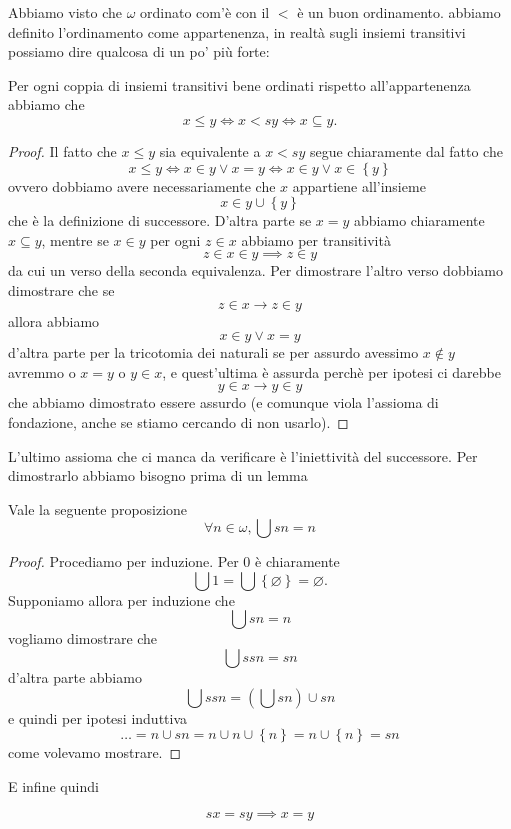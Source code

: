 \documentclass[11pt]{scrartcl}
\newcommand{\eset}{\varnothing}
\begin{document}
 	Abbiamo visto che $\omega$ ordinato com'è con il $<$ è un buon ordinamento. abbiamo definito l'ordinamento come appartenenza, in realtà sugli insiemi transitivi possiamo dire qualcosa di un po' più forte:
 	\begin{proposition}
 		Per ogni coppia di insiemi transitivi bene ordinati rispetto all'appartenenza abbiamo che
 		$$x\le y \iff x< sy \iff x\subseteq y.$$
 	\end{proposition}
 	\begin{proof}
 		Il fatto che $x\le y$ sia equivalente a $x<sy$ segue chiaramente dal fatto che
 		$$x\le y \iff x\in y\lor x=y \iff x\in y\lor x\in\left\{y\right\} $$
 		ovvero dobbiamo avere necessariamente che $x$ appartiene all'insieme 
 		$$x\in y\cup\left\{y\right\}$$
 		che è la definizione di successore. D'altra parte se $x=y$ abbiamo chiaramente $x\subseteq y$, mentre se $x\in y$ per ogni $z\in x$ abbiamo per transitività
 		$$z\in x \in y \implies z\in y$$
 		da cui un verso della seconda equivalenza. Per dimostrare l'altro verso dobbiamo dimostrare che se 
 		$$z\in x \to z\in y$$
 		allora abbiamo 
 		$$x\in y \lor x=y$$
 		d'altra parte per la tricotomia dei naturali se per assurdo avessimo $x\not\in y$ avremmo o $x=y$ o $y\in x$, e quest'ultima è assurda perchè per ipotesi ci darebbe
 		$$y\in x \to y\in y$$
 		che abbiamo dimostrato essere assurdo (e comunque viola l'assioma di fondazione, anche se stiamo cercando di non usarlo).
 	\end{proof}
 	L'ultimo assioma che ci manca da verificare è l'iniettività del successore. Per dimostrarlo abbiamo bisogno prima di un lemma
 	\begin{lemma}
 		Vale la seguente proposizione
 		$$\forall n\in \omega, \bigcup sn=n$$
 	\end{lemma}
 	\begin{proof}
 		Procediamo per induzione. Per $0$ è chiaramente
 		$$\bigcup 1 = \bigcup\left\{\eset\right\}=\eset.$$
 		Supponiamo allora per induzione che 
 		$$\bigcup sn = n$$
 		vogliamo dimostrare che
 		$$\bigcup ssn =sn$$
 		d'altra parte abbiamo
 		$$\bigcup ssn=\left(\bigcup sn\right)\cup sn$$
 		e quindi per ipotesi induttiva
 		$$\dots=n\cup sn=n\cup n\cup \left\{n\right\} =n\cup \left\{n\right\}=sn$$
 		come volevamo mostrare.
 	\end{proof}
 	E infine quindi 
 	\begin{proposition}
 		$$sx = sy \implies x=y$$
 	\end{proposition}
\end{document}
